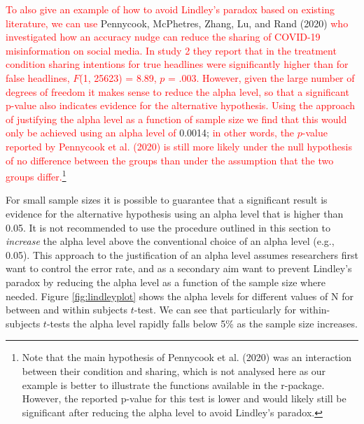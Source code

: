 \documentclass[
  english,
  ,man, a4paper,floatsintext]{apa6}
\begin{document}
\textcolor{red}{To also give an example of how to avoid Lindley's paradox based on existing literature, we can use} Pennycook, McPhetres, Zhang, Lu, and Rand (2020)
\textcolor{red}{who investigated how an accuracy nudge can reduce the sharing of COVID-19 misinformation on social media. In study 2 they report that in the treatment condition sharing intentions for true headlines were significantly higher than for false headlines, $F$(1, 25623) = 8.89, $p$ = .003. However, given the large number of degrees of freedom it makes sense to reduce the alpha level, so that a significant p-value also indicates evidence for the alternative hypothesis. Using the approach of justifying the alpha level as a function of sample size we find that this would only be achieved using an alpha level of} 0.0014;
\textcolor{red}{in other words, the $p$-value reported by Pennycook et al. (2020) is still more likely under the null hypothesis of no difference between the groups than under the assumption that the two groups differ.}\footnote{Note that the main hypothesis of Pennycook et al. (2020) was an interaction between their condition and sharing, which is not analysed here as our example is better to illustrate the functions available in the r-package. However, the reported p-value for this test is lower and would likely still be significant after reducing the alpha level to avoid Lindley’s paradox.}

For small sample sizes it is possible to guarantee that a significant result is evidence for the alternative hypothesis using an alpha level that is higher than 0.05. It is not recommended to use the procedure outlined in this section to \emph{increase} the alpha level above the conventional choice of an alpha level (e.g., 0.05). This approach to the justification of an alpha level assumes researchers first want to control the error rate, and as a secondary aim want to prevent Lindley's paradox by reducing the alpha level as a function of the sample size where needed. Figure \ref{fig:lindleyplot} shows the alpha levels for different values of N for between and within subjects \(t\)-test. We can see that particularly for within-subjects \(t\)-tests the alpha level rapidly falls below 5\% as the sample size increases.
\end{document}
